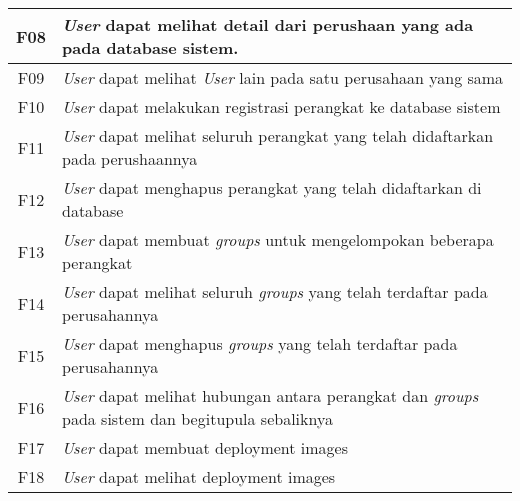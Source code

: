 \begin{table}[ht]
\begin{tabular}{|c|p{12cm}|}
    \\
    \hline
    F08 & \textit{User} dapat melihat detail dari perushaan yang ada pada database sistem.                                \\
    \hline
    F09 & \textit{User} dapat melihat \textit{User} lain pada satu perusahaan yang sama                                   \\
    \hline
    F10 & \textit{User} dapat melakukan registrasi perangkat ke database sistem                                           \\
    \hline
    F11 & \textit{User} dapat melihat seluruh perangkat yang telah didaftarkan pada perushaannya                          \\
    \hline
    F12 & \textit{User} dapat menghapus perangkat yang telah didaftarkan di database                                      \\
    \hline
    F13 & \textit{User} dapat membuat \textit{groups} untuk mengelompokan beberapa perangkat                              \\
    \hline
    F14 & \textit{User} dapat melihat seluruh \textit{groups} yang telah terdaftar pada perusahannya                      \\
    \hline
    F15 & \textit{User} dapat menghapus \textit{groups} yang telah terdaftar pada perusahannya                            \\
    \hline
    F16 & \textit{User} dapat melihat hubungan antara perangkat dan \textit{groups} pada sistem dan begitupula sebaliknya \\
    \hline
    F17 & \textit{User} dapat membuat deployment images                                                                   \\
    \hline
    F18 & \textit{User} dapat melihat deployment images                                                                   \\
    \hline
  \end{tabular}
\end{table}
\egroup

\pagebreak

